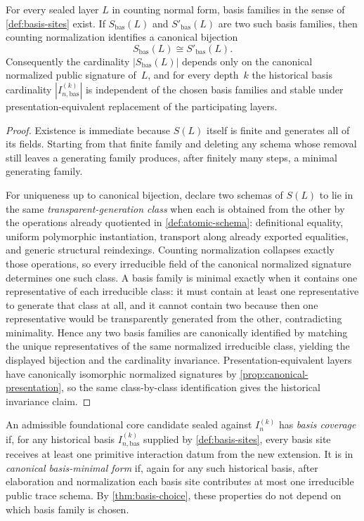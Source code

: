 \documentclass{lmcs}
\begin{document}
\begin{thm}
\label{thm:basis-choice}
For every sealed layer $L$ in counting normal form, basis families in the sense
of \autoref{def:basis-sites} exist. If $S_{\mathrm{bas}}(L)$ and
$S'_{\mathrm{bas}}(L)$ are two such basis families, then counting
normalization identifies a canonical bijection
\[
  S_{\mathrm{bas}}(L) \cong S'_{\mathrm{bas}}(L).
\]
Consequently the cardinality $|S_{\mathrm{bas}}(L)|$ depends only on the
canonical normalized public signature of~$L$, and for every depth~$k$ the
historical basis cardinality $|I_{n,\mathrm{bas}}^{(k)}|$ is independent of the
chosen basis families and stable under presentation-equivalent replacement of
the participating layers.
\end{thm}

\begin{proof}
Existence is immediate because $S(L)$ itself is finite and generates all of its
fields. Starting from that finite family and deleting any schema whose removal
still leaves a generating family produces, after finitely many steps, a minimal
generating family.

For uniqueness up to canonical bijection, declare two schemas of $S(L)$ to lie
in the same \emph{transparent-generation class} when each is obtained from the
other by the operations already quotiented in \autoref{def:atomic-schema}:
definitional equality, uniform polymorphic instantiation, transport along
already exported equalities, and generic structural reindexings. Counting
normalization collapses exactly those operations, so every irreducible field of
the canonical normalized signature determines one such class. A basis family is
minimal exactly when it contains one representative of each irreducible class:
it must contain at least one representative to generate that class at all, and
it cannot contain two because then one representative would be transparently
generated from the other, contradicting minimality. Hence any two basis
families are canonically identified by matching the unique representatives of
the same normalized irreducible class, yielding the displayed bijection and the
cardinality invariance. Presentation-equivalent layers have canonically
isomorphic normalized signatures by \autoref{prop:canonical-presentation}, so
the same class-by-class identification gives the historical invariance claim.
\end{proof}

\begin{defi}
\label{def:max-density}
An admissible foundational core candidate sealed against $I_n^{(k)}$ has
\emph{basis coverage} if, for any historical basis
$I_{n,\mathrm{bas}}^{(k)}$ supplied by \autoref{def:basis-sites}, every basis
site receives at least one primitive interaction datum from the new extension.
It is in \emph{canonical basis-minimal form} if, again for any such historical
basis, after elaboration and normalization each basis site contributes at most
one irreducible public trace schema. By \autoref{thm:basis-choice}, these
properties do not depend on which basis family is chosen.
\end{defi}
\end{document}
